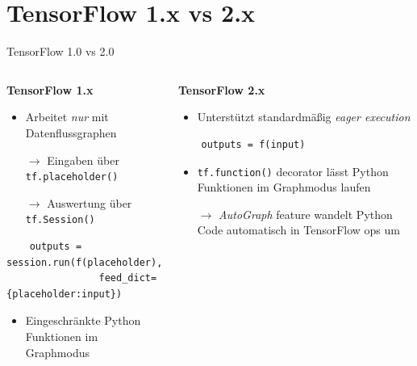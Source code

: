 \documentclass[utf8, smaller, c]{beamer}
\renewcommand{\tt}[1]{{\texttt{#1}}}
\begin{document}
\section{TensorFlow 1.x vs 2.x}
\begin{frame}[fragile]{TensorFlow 1.0 vs 2.0}
    \begin{columns}
        \begin{column}{0.54\textwidth}
            \textbf{TensorFlow 1.x}
            \begin{itemize}
                \item Arbeitet \textit{nur} mit Datenflussgraphen
                \item[$\rightarrow$] Eingaben über \tt{tf.placeholder()}
                \item[$\rightarrow$] Auswertung über \tt{tf.Session()}
            \end{itemize}
            \begin{lstlisting}
    outputs = session.run(f(placeholder),
                feed_dict={placeholder:input})
            \end{lstlisting}
            \begin{itemize}
                \item Eingeschränkte Python Funktionen im Graphmodus
            \end{itemize}
        \end{column}
        \begin{column}{0.46\textwidth}
            \textbf{TensorFlow 2.x}
            \begin{itemize}
                \item Unterstützt standardmäßig \textit{eager execution}
            \end{itemize}
            \begin{lstlisting}
    outputs = f(input)
            \end{lstlisting}
            \begin{itemize}
                \item \tt{tf.function()} decorator lässt Python Funktionen im Graphmodus laufen
                \item[$\rightarrow$] \textit{AutoGraph} feature wandelt Python Code automatisch in TensorFlow ops um
            \end{itemize}
        \end{column}
    \end{columns}
\end{frame}
\end{document}
